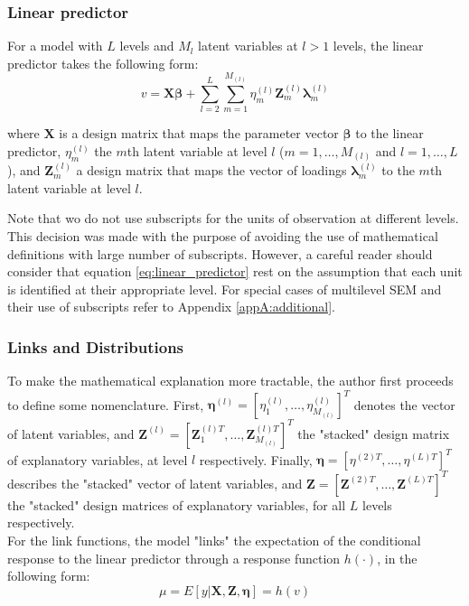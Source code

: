 \subsubsection{Linear predictor}
For a model with $L$ levels and $M_{l}$ latent variables at $l>1$ levels, the linear predictor takes the following form:
\begin{equation} \label{eq:linear_predictor}
	v = \mathbf{X} \pmb{\beta} + \sum_{l=2}^{L} \sum_{m=1}^{M_{(l)}} \eta_{m}^{(l)} \mathbf{Z}_{m}^{(l)} \pmb{\lambda}_{m}^{(l)}
\end{equation}

\noindent where $\mathbf{X}$ is a design matrix that maps the parameter vector $\pmb{\beta}$ to the linear predictor, $\eta_{m}^{(l)}$ the $m$th latent variable at level $l$ ($m=1, \dots, M_{(l)}$ and $l=1, \dots, L$), and $\mathbf{Z}_{m}^{(l)}$ a design matrix that maps the vector of loadings $\pmb{\lambda}_{m}^{(l)}$ to the $m$th latent variable at level $l$.

Note that wo do not use subscripts for the units of observation at different levels. This decision was made with the purpose of avoiding the use of mathematical definitions with large number of subscripts. However, a careful reader should consider that equation \ref{eq:linear_predictor} rest on the assumption that each unit is identified at their appropriate level. For special cases of multilevel SEM and their use of subscripts refer to Appendix \ref{appA:additional}.

\subsubsection{Links and Distributions}
To make the mathematical explanation more tractable, the author first proceeds to define some nomenclature. First, $\pmb{\eta}^{(l)}=[\eta_{1}^{(l)}, \dots, \eta_{M_{(l)}}^{(l)}]^{T}$ denotes the vector of latent variables, and $\mathbf{Z}^{(l)}=[\mathbf{Z}_{1}^{(l)T}, \dots, \mathbf{Z}_{M_{(l)}}^{(l)T}]^{T}$ the "stacked" design matrix of explanatory variables, at level $l$ respectively. Finally, $\pmb{\eta}=[\eta^{(2)T}, \dots, \eta^{(L)T}]^{T}$ describes the "stacked" vector of latent variables, and $\mathbf{Z}=[\mathbf{Z}^{(2)T}, \dots, \mathbf{Z}^{(L)T}]^{T}$ the "stacked" design matrices of explanatory variables, for all $L$ levels respectively. \\

For the link functions, the model "links" the expectation of the conditional response to the linear predictor through a response function $h(\cdot)$, in the following form: 
\begin{equation} \label{eq:response_function}
	\mu = E[y | \mathbf{X}, \mathbf{Z}, \pmb{\eta}] = h(v)
\end{equation}

